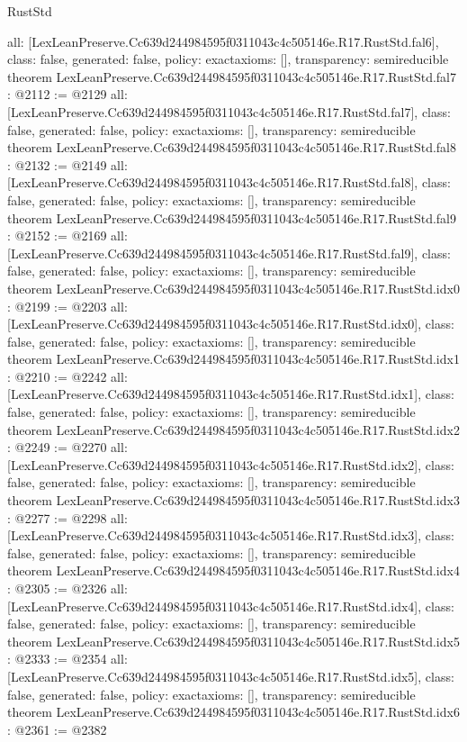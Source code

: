 \begin{lexlean}{RustStd}
\begin{coremodule}
{  all: [LexLeanPreserve.Cc639d244984595f0311043c4c505146e.R17.RustStd.fal6],
  class: false,
  generated: false,
  policy: exact{axioms: []},
  transparency: semireducible
}
theorem LexLeanPreserve.Cc639d244984595f0311043c4c505146e.R17.RustStd.fal7 : @2112 := @2129 {
  all: [LexLeanPreserve.Cc639d244984595f0311043c4c505146e.R17.RustStd.fal7],
  class: false,
  generated: false,
  policy: exact{axioms: []},
  transparency: semireducible
}
theorem LexLeanPreserve.Cc639d244984595f0311043c4c505146e.R17.RustStd.fal8 : @2132 := @2149 {
  all: [LexLeanPreserve.Cc639d244984595f0311043c4c505146e.R17.RustStd.fal8],
  class: false,
  generated: false,
  policy: exact{axioms: []},
  transparency: semireducible
}
theorem LexLeanPreserve.Cc639d244984595f0311043c4c505146e.R17.RustStd.fal9 : @2152 := @2169 {
  all: [LexLeanPreserve.Cc639d244984595f0311043c4c505146e.R17.RustStd.fal9],
  class: false,
  generated: false,
  policy: exact{axioms: []},
  transparency: semireducible
}
theorem LexLeanPreserve.Cc639d244984595f0311043c4c505146e.R17.RustStd.idx0 : @2199 := @2203 {
  all: [LexLeanPreserve.Cc639d244984595f0311043c4c505146e.R17.RustStd.idx0],
  class: false,
  generated: false,
  policy: exact{axioms: []},
  transparency: semireducible
}
theorem LexLeanPreserve.Cc639d244984595f0311043c4c505146e.R17.RustStd.idx1 : @2210 := @2242 {
  all: [LexLeanPreserve.Cc639d244984595f0311043c4c505146e.R17.RustStd.idx1],
  class: false,
  generated: false,
  policy: exact{axioms: []},
  transparency: semireducible
}
theorem LexLeanPreserve.Cc639d244984595f0311043c4c505146e.R17.RustStd.idx2 : @2249 := @2270 {
  all: [LexLeanPreserve.Cc639d244984595f0311043c4c505146e.R17.RustStd.idx2],
  class: false,
  generated: false,
  policy: exact{axioms: []},
  transparency: semireducible
}
theorem LexLeanPreserve.Cc639d244984595f0311043c4c505146e.R17.RustStd.idx3 : @2277 := @2298 {
  all: [LexLeanPreserve.Cc639d244984595f0311043c4c505146e.R17.RustStd.idx3],
  class: false,
  generated: false,
  policy: exact{axioms: []},
  transparency: semireducible
}
theorem LexLeanPreserve.Cc639d244984595f0311043c4c505146e.R17.RustStd.idx4 : @2305 := @2326 {
  all: [LexLeanPreserve.Cc639d244984595f0311043c4c505146e.R17.RustStd.idx4],
  class: false,
  generated: false,
  policy: exact{axioms: []},
  transparency: semireducible
}
theorem LexLeanPreserve.Cc639d244984595f0311043c4c505146e.R17.RustStd.idx5 : @2333 := @2354 {
  all: [LexLeanPreserve.Cc639d244984595f0311043c4c505146e.R17.RustStd.idx5],
  class: false,
  generated: false,
  policy: exact{axioms: []},
  transparency: semireducible
}
theorem LexLeanPreserve.Cc639d244984595f0311043c4c505146e.R17.RustStd.idx6 : @2361 := @2382 {
}
\end{coremodule}
\end{lexlean}
